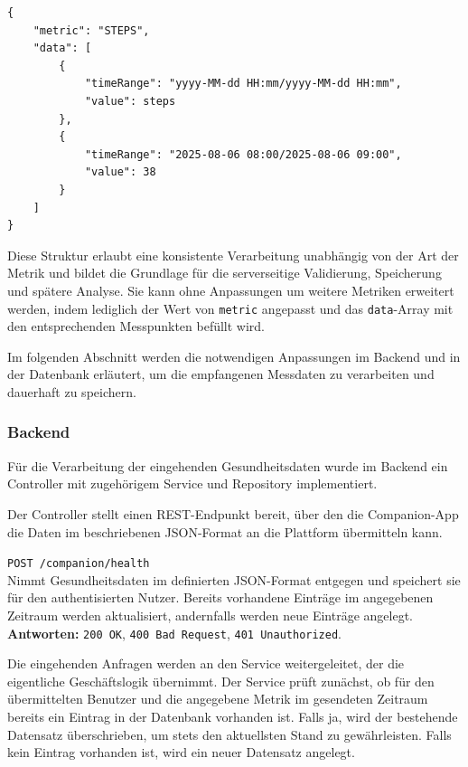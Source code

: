 \documentclass[12pt,a4paper]{report}
\begin{document}
\begin{verbatim}
{
    "metric": "STEPS",
    "data": [
        {
            "timeRange": "yyyy-MM-dd HH:mm/yyyy-MM-dd HH:mm",
            "value": steps
        },
        {
            "timeRange": "2025-08-06 08:00/2025-08-06 09:00",
            "value": 38
        }
    ]
}
\end{verbatim}

Diese Struktur erlaubt eine konsistente Verarbeitung unabhängig von der Art der Metrik und bildet die Grundlage für die
serverseitige Validierung, Speicherung und spätere Analyse. Sie kann ohne Anpassungen um weitere Metriken erweitert werden,
indem lediglich der Wert von \texttt{metric} angepasst und das \texttt{data}-Array mit den entsprechenden Messpunkten befüllt
wird.

Im folgenden Abschnitt werden die notwendigen Anpassungen im Backend und in der Datenbank erläutert, um die empfangenen
Messdaten zu verarbeiten und dauerhaft zu speichern.

\subsubsection{Backend}

Für die Verarbeitung der eingehenden Gesundheitsdaten wurde im Backend ein Controller mit zugehörigem Service und Repository
implementiert. 

Der Controller stellt einen REST-Endpunkt bereit, über den die Companion-App die Daten im beschriebenen JSON-Format an die
Plattform übermitteln kann. 

\begin{description}
  \item \texttt{POST /companion/health} \\
        Nimmt Gesundheitsdaten im definierten JSON-Format entgegen und speichert sie für den authentisierten Nutzer. 
        Bereits vorhandene Einträge im angegebenen Zeitraum werden aktualisiert, andernfalls werden neue Einträge angelegt. \\
        \textbf{Antworten:} \texttt{200 OK}, \texttt{400 Bad Request}, \texttt{401 Unauthorized}.
\end{description}

Die eingehenden Anfragen werden an den Service weitergeleitet, der die eigentliche Geschäftslogik übernimmt. Der Service prüft
zunächst, ob für den übermittelten Benutzer und die angegebene Metrik im gesendeten Zeitraum bereits ein Eintrag in der Datenbank
vorhanden ist. Falls ja, wird der bestehende Datensatz überschrieben, um stets den aktuellsten Stand zu gewährleisten. Falls kein
Eintrag vorhanden ist, wird ein neuer Datensatz angelegt.  
\end{document}
